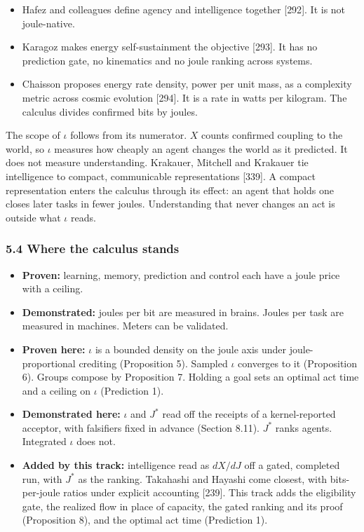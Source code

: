 \documentclass[
  10pt,
]{article}
\providecommand{\tightlist}{%
  \setlength{\itemsep}{0pt}\setlength{\parskip}{0pt}}
\begin{document}
\begin{itemize}
  and colleagues reply that scalar reward cannot express multi-objective
  goals {[}291{]}. This track keeps one variable, joules, and moves
  multiplicity into the gate \(X \ge X_{\mathrm{req}}\).
\item
  Hafez and colleagues define agency and intelligence together
  {[}292{]}. It is not joule-native.
\item
  Karagoz makes energy self-sustainment the objective {[}293{]}. It has
  no prediction gate, no kinematics and no joule ranking across systems.
\item
  Chaisson proposes energy rate density, power per unit mass, as a
  complexity metric across cosmic evolution {[}294{]}. It is a rate in
  watts per kilogram. The calculus divides confirmed bits by joules.
\end{itemize}

The scope of \(\iota\) follows from its numerator. \(X\) counts
confirmed coupling to the world, so \(\iota\) measures how cheaply an
agent changes the world as it predicted. It does not measure
understanding. Krakauer, Mitchell and Krakauer tie intelligence to
compact, communicable representations {[}339{]}. A compact
representation enters the calculus through its effect: an agent that
holds one closes later tasks in fewer joules. Understanding that never
changes an act is outside what \(\iota\) reads.

\subsubsection{5.4 Where the calculus
stands}\label{where-the-calculus-stands}

\begin{itemize}
\tightlist
\item
  \textbf{Proven:} learning, memory, prediction and control each have a
  joule price with a ceiling.
\item
  \textbf{Demonstrated:} joules per bit are measured in brains. Joules
  per task are measured in machines. Meters can be validated.
\item
  \textbf{Proven here:} \(\iota\) is a bounded density on the joule axis
  under joule-proportional crediting (Proposition 5). Sampled \(\iota\)
  converges to it (Proposition 6). Groups compose by Proposition 7.
  Holding a goal sets an optimal act time and a ceiling on \(\iota\)
  (Prediction 1).
\item
  \textbf{Demonstrated here:} \(\iota\) and \(J^*\) read off the
  receipts of a kernel-reported acceptor, with falsifiers fixed in
  advance (Section 8.11). \(J^*\) ranks agents. Integrated \(\iota\)
  does not.
\item
  \textbf{Added by this track:} intelligence read as \(dX/dJ\) off a
  gated, completed run, with \(J^*\) as the ranking. Takahashi and
  Hayashi come closest, with bits-per-joule ratios under explicit
  accounting {[}239{]}. This track adds the eligibility gate, the
  realized flow in place of capacity, the gated ranking and its proof
  (Proposition 8), and the optimal act time (Prediction 1).
\end{itemize}
\end{document}
